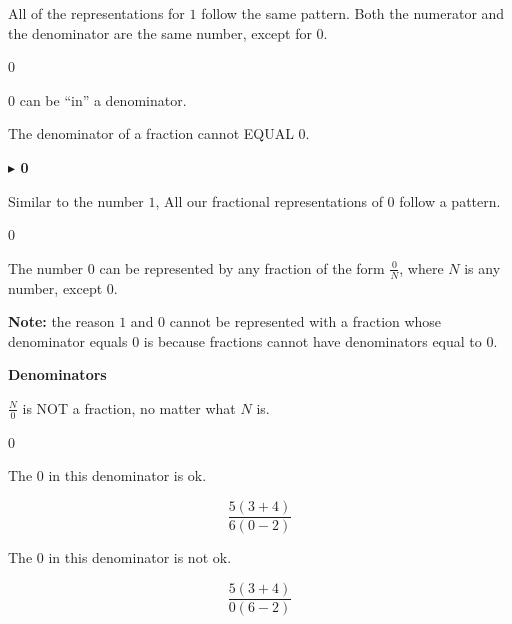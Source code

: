 \documentclass{ximera}
\begin{document}
All of the representations for $1$ follow the same pattern.  Both the numerator and the denominator are the same number, except for $0$. 



\begin{warning}  \textbf{\textcolor{red!70!black}{$0$}}

$0$ can be ``in'' a denominator.

The denominator of a fraction cannot EQUAL $0$.

\end{warning}












\textbf{\textcolor{purple!85!blue}{$\blacktriangleright$ 0}} 


Similar to the number $1$, All our fractional representations of $0$ follow a pattern.






\begin{idea} \textbf{\textcolor{blue!55!black}{$0$}} 

The number $0$ can be represented by any fraction of the form $\frac{0}{N}$, where $N$ is any number, except $0$.


\end{idea}

\textbf{Note:} the reason $1$ and $0$ cannot be represented with a fraction whose denominator equals $0$ is because fractions cannot have denominators equal to $0$.






\begin{warning} \textbf{\textcolor{red!70!black}{Denominators}}


$\frac{N}{0}$ is NOT a fraction, no matter what $N$ is.



\end{warning}





\begin{example} $0$

The $0$ in this denominator is ok.

\[
\frac{5(3 + 4)}{6(0 - 2)}
\]


The $0$ in this denominator is not ok.

\[
\frac{5(3 + 4)}{0(6 - 2)}
\]


\end{example}
\end{document}
